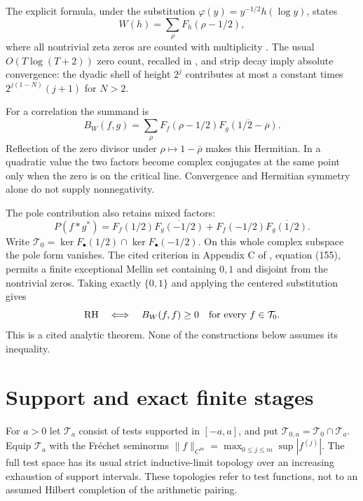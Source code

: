 \documentclass[11pt,letterpaper]{article}
\theoremstyle{definition}
\theoremstyle{remark}
\newcommand{\T}{\mathcal T}
\begin{document}
The explicit formula, under the substitution
$\varphi(y)=y^{-1/2}h(\log y)$, states
\begin{equation}
 W(h)=\sum_\rho F_h(\rho-1/2),
 \label{eq:zeros}
\end{equation}
where all nontrivial zeta zeros are counted with multiplicity
\cite[Appendix B, equations (147) to (150)]{CC20}.
The usual $O(T\log(T+2))$ zero count, recalled in
\cite[Section 2.1.5]{C26}, and strip decay imply absolute convergence:
the dyadic shell of height $2^j$ contributes at most a constant times
$2^{j(1-N)}(j+1)$ for $N>2$.

For a correlation the summand is
\begin{equation}
 B_W(f,g)=\sum_\rho F_f(\rho-1/2)
                 \overline{F_g(1/2-\overline\rho)}.
 \label{eq:mixed-zero}
\end{equation}
Reflection of the zero divisor under $\rho\mapsto1-\overline\rho$
makes this Hermitian. In a quadratic value the two factors become
complex conjugates at the same point only when the zero is on the
critical line. Convergence and Hermitian symmetry alone do not supply
nonnegativity.

The pole contribution also retains mixed factors:
\begin{equation}
 P(f*g^*)=F_f(1/2)\overline{F_g(-1/2)}
          +F_f(-1/2)\overline{F_g(1/2)}.
 \label{eq:mixed-poles}
\end{equation}
Write $\T_0=\ker F_{\bullet}(1/2)\cap\ker F_{\bullet}(-1/2)$.
On this whole complex subspace the pole form vanishes. The cited
criterion in Appendix C of \cite{CC20}, equation (155), permits a
finite exceptional Mellin set containing $0,1$ and disjoint from the
nontrivial zeros. Taking exactly $\{0,1\}$ and applying the centered
substitution gives
\begin{equation}
 \mathrm{RH}\quad\Longleftrightarrow\quad
 B_W(f,f)\ge0\quad\hbox{for every }f\in\T_0.
 \label{eq:T0-criterion}
\end{equation}
This is a cited analytic theorem. None of the constructions below
assumes its inequality.

\section{Support and exact finite stages}

For $a>0$ let $\T_a$ consist of tests supported in $[-a,a]$, and
put $\T_{0,a}=\T_0\cap\T_a$. Equip $\T_a$ with the Fr\'echet
seminorms $\|f\|_{C^m}=\max_{0\le j\le m}\sup|f^{(j)}|$.
The full test space has its usual strict inductive-limit topology
over an increasing exhaustion of support intervals. These topologies
refer to test functions, not to an assumed Hilbert completion of the
arithmetic pairing.
\end{document}
